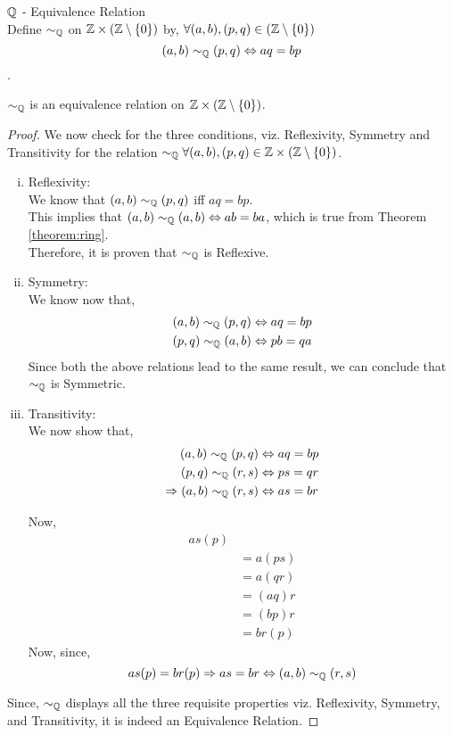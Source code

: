 \documentclass[11pt]{scrartcl}
\begin{document}
 \begin{definition}
 	$\mathbb Q$ - Equivalence Relation\\
 	Define $\sim_{\mathbb Q}$ on $\mathbb Z \times \left(\mathbb Z \setminus \{0\}\right)$ by, $\forall (a,b),(p,q) \in (\mathbb Z \setminus \{ 0 \} )$
 	$$(a,b) \sim_{\mathbb Q} (p,q) \Leftrightarrow aq = bp$$.
 \end{definition}

\begin{lemma}
	$\sim_{\mathbb Q}$ is an equivalence relation on $\mathbb Z \times (\mathbb Z \setminus \{0\})$.
\end{lemma}

\begin{proof}
	We now check for the three conditions, viz. Reflexivity, Symmetry and Transitivity for the relation $\sim_{\mathbb Q} \forall (a,b),(p,q) \in \mathbb Z \times (\mathbb Z \setminus \{0\})$.
	\begin{enumerate}[(i)]
		\item Reflexivity:\\
		 We know that $(a,b) \sim_{\mathbb Q} (p,q)$ iff $aq=bp$.\\
		 This implies that $(a,b)\sim_{\mathbb Q}(a,b) \Leftrightarrow ab=ba$, which is true from Theorem \ref{theorem:ring}.\\
		 Therefore, it is proven that $\sim_{\mathbb Q}$ is Reflexive.
		 
		 \item Symmetry:\\
		 We know now that,
		 \begin{align*}
		 	(a,b) \sim_{\mathbb Q} (p,q) \Leftrightarrow aq=bp \\
		 	(p,q) \sim_{\mathbb Q} (a,b) \Leftrightarrow pb=qa
		 \end{align*}
	 	Since both the above relations lead to the same result, we can conclude that $\sim_{\mathbb Q}$ is Symmetric.
	 	
	 	\item Transitivity:\\
	 	We now show that,
	 	\begin{align*}
	 		(a,b) \sim_{\mathbb Q} (p,q) &\Leftrightarrow aq=bp \\
	 		(p,q) \sim_{\mathbb Q} (r,s) &\Leftrightarrow ps=qr \\
	 		\Rightarrow (a,b) \sim_{\mathbb Q} (r,s) &\Leftrightarrow as=br
	 	\end{align*}
 	
 		Now,
 		\begin{align*}
 			as(p)\\
 			&= a(ps)\\
 			&= a(qr)\\
 			&= (aq)r\\
 			&= (bp)r\\
 			&= br(p)
 		\end{align*}
 		Now, since, $$as(p) = br(p) \Rightarrow as = br \Leftrightarrow (a,b) \sim_{\mathbb Q} (r,s)$$
	\end{enumerate}
	Since, $\sim_{\mathbb Q}$ displays all the three requisite properties viz. Reflexivity, Symmetry, and Transitivity, it is indeed an Equivalence Relation.
\end{proof} 
\end{document}
